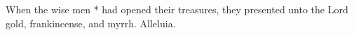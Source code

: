 When the wise men * had opened their treasures, they presented unto the Lord gold, frankincense, and myrrh. Alleluia.